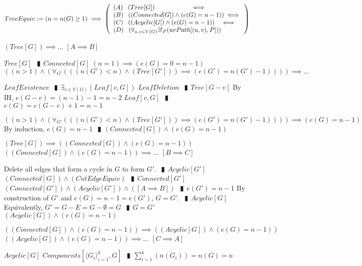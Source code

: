 \documentclass{book}
\newcommand{\abr}{:=}
\newcommand{\pipe}{$\phantom{(}\vrectangleblack\phantom{)}$}
\begin{document}
$TreeEquiv \abr (n = n(G) \geq 1) \implies
\left(\begin{array}{ll}
  (A) \phantom{-} (Tree[G]) \hfill \iff \hfill \\
  (B) \phantom{-} ((Connected[G]) \land (e(G) = n - 1)) \hfill \iff \hfill \\
  (C) \phantom{-} ((Acyclic[G]) \land (e(G) = n - 1)) \hfill \iff \hfill \\
  (D) \phantom{-} (\forall_{u, v \in V(G)} \exists!_{P}(uvPath[(u, v), P]))
\end{array}\right)$ \\
\begin{enumerate}
  \lit $(Tree[G]) \implies \ldots$    $[A \implies B]$
  \begin{enumerate}
    \lit $Tree[G]$ \pipe $Connected[G]$
    \lit $(n = 1) \implies (e(G) = 0 = n - 1)$
    \lit $((n > 1) \land (\forall_{G'}(((n(G') < n) \land (Tree[G'])) \implies (e(G') = n(G') - 1)))) \implies \ldots$
    \begin{enumerate}
      \lit $LeafExistence$ \pipe $\exists_{v \in V(G)}(Leaf[v, G])$
      \lit $LeafDeletion$ \pipe $Tree[G - v]$
      \lit By IH, $e(G - v) = (n - 1) - 1 = n - 2$
      \lit $Leaf[v, G]$ \pipe $e(G) = e(G - v) + 1 = n - 1$
    \end{enumerate}
    \lit $((n > 1) \land (\forall_{G'}(((n(G') < n) \land (Tree[G'])) \implies (e(G') = n(G') - 1)))) \implies (e(G) = n - 1)$
    \lit By induction, $e(G) = n - 1$ \pipe $(Connected[G]) \land (e(G) = n - 1)$
  \end{enumerate}
  \lit $(Tree[G]) \implies ((Connected[G]) \land (e(G) = n - 1))$
  \lit $((Connected[G]) \land (e(G) = n - 1)) \implies \ldots$    $[B \implies C]$
  \begin{enumerate}
    \lit Delete all edges that form a cycle in $G$ to form $G'$. \pipe $Acyclic[G']$
    \lit $(Connected[G]) \land (CutEdgeEquiv)$ \pipe $Connected[G']$
    \lit $(Connected[G']) \land (Acyclic[G']) \land ([A \implies B])$ \pipe $e(G') = n - 1$
    \lit By construction of $G'$ and $e(G) = n - 1 = e(G')$, $G = G'$. \pipe $Acyclic[G]$
    \lit Equivalently, $G' = G - E = G - \emptyset = G$ \pipe $G = G'$
    \lit $(Acyclic[G]) \land (e(G) = n - 1)$
  \end{enumerate}
  \lit $((Connected[G]) \land (e(G) = n - 1)) \implies ((Acyclic[G]) \land (e(G) = n - 1))$
  \lit $((Acyclic[G]) \land (e(G) = n - 1)) \implies \ldots$    $[C \implies A]$
  \begin{enumerate}
    \lit $Acyclic[G]$
    \lit $Components[\langle G_i \rangle_{i = 1}^k, G]$ \pipe $\sum \limits_{i = 1}^k(n(G_i)) = n(G) = n$

\end{enumerate}
\end{enumerate}
\end{document}
